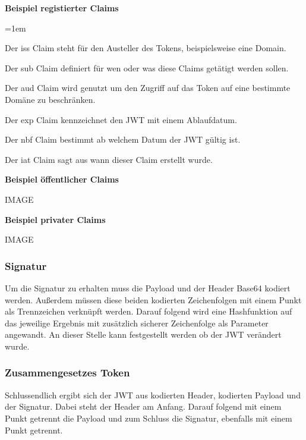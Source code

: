 \documentclass[11pt]{article}
\begin{document}
\begin{flushleft}
			
			\textbf{Beispiel registierter Claims}
			
			\begin{description}
				\leftskip=1em
				\item[iss]
				Der iss Claim steht für den Austeller des Tokens, beispielsweise eine Domain.
				\item[sub] Der sub Claim definiert für wen oder was diese Claims getätigt werden sollen.
				\item[aud] Der aud Claim wird genutzt um den Zugriff auf das Token auf eine bestimmte Domäne zu beschränken.
				\item[exp] Der exp Claim kennzeichnet den JWT mit einem Ablaufdatum.
				\item[nbf] Der nbf Claim bestimmt ab welchem Datum der JWT gültig ist.
				\item[iat] Der iat Claim sagt aus wann dieser Claim erstellt wurde.
			\end{description}
		
			\textbf{Beispiel öffentlicher Claims}
			
			IMAGE\par\bigskip
			
			
			\textbf{Beispiel privater Claims}
			
			IMAGE\par\bigskip
			
			
			\subsubsection{Signatur}
			\label{sec: jwt_signature}
			
			Um die Signatur zu erhalten muss die Payload und der Header Base64 kodiert werden. Außerdem müssen diese beiden kodierten Zeichenfolgen mit einem Punkt als Trennzeichen verknüpft werden. Darauf folgend wird eine Hashfunktion auf das jeweilige Ergebnis mit zusätzlich sicherer Zeichenfolge als Parameter angewandt. An dieser Stelle kann festgestellt werden ob der JWT verändert wurde.\par\bigskip
			
			
			\subsubsection{Zusammengesetzes Token}
			\label{sec: jwt_result}
			Schlussendlich ergibt sich der JWT aus kodierten Header, kodierten Payload und der Signatur. Dabei steht der Header am Anfang. Darauf folgend mit einem Punkt getrennt die Payload und zum Schluss die Signatur, ebenfalls mit einem Punkt getrennt. \par\bigskip
			

\end{flushleft}
\end{document}

